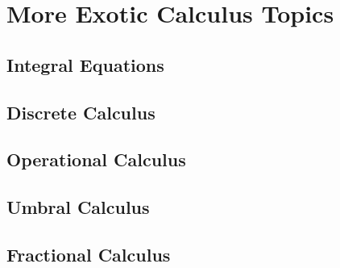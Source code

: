 \section{More Exotic Calculus Topics}

\subsection{Integral Equations}


\subsection{Discrete Calculus}



\subsection{Operational Calculus}

\subsection{Umbral Calculus}

\subsection{Fractional Calculus}







